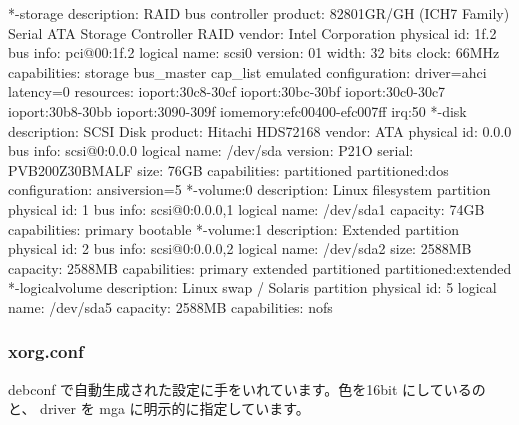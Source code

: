 \documentclass[mingoth,a4paper]{jsarticle}
\begin{document}
\begin{commandline}
        *-storage
             description: RAID bus controller
             product: 82801GR/GH (ICH7 Family) Serial ATA Storage Controller RAID
             vendor: Intel Corporation
             physical id: 1f.2
             bus info: pci@00:1f.2
             logical name: scsi0
             version: 01
             width: 32 bits
             clock: 66MHz
             capabilities: storage bus_master cap_list emulated
             configuration: driver=ahci latency=0
             resources: ioport:30c8-30cf ioport:30bc-30bf ioport:30c0-30c7 ioport:30b8-30bb ioport:3090-309f iomemory:efc00400-efc007ff irq:50
           *-disk
                description: SCSI Disk
                product: Hitachi HDS72168
                vendor: ATA
                physical id: 0.0.0
                bus info: scsi@0:0.0.0
                logical name: /dev/sda
                version: P21O
                serial: PVB200Z30BMALF
                size: 76GB
                capabilities: partitioned partitioned:dos
                configuration: ansiversion=5
              *-volume:0
                   description: Linux filesystem partition
                   physical id: 1
                   bus info: scsi@0:0.0.0,1
                   logical name: /dev/sda1
                   capacity: 74GB
                   capabilities: primary bootable
              *-volume:1
                   description: Extended partition
                   physical id: 2
                   bus info: scsi@0:0.0.0,2
                   logical name: /dev/sda2
                   size: 2588MB
                   capacity: 2588MB
                   capabilities: primary extended partitioned partitioned:extended
                 *-logicalvolume
                      description: Linux swap / Solaris partition
                      physical id: 5
                      logical name: /dev/sda5
                      capacity: 2588MB
                      capabilities: nofs
\end{commandline}

\subsubsection{xorg.conf}

debconf で自動生成された設定に手をいれています。色を16bit にしているのと、
driver を mga に明示的に指定しています。
\end{document}

